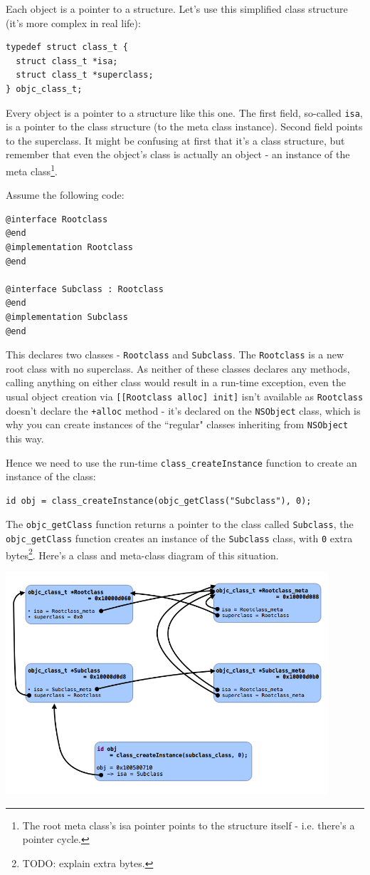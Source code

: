 Each object is a pointer to a structure. Let's use this simplified class structure (it's more complex in real life):

\begin{verbatim}
typedef struct class_t {
  struct class_t *isa;
  struct class_t *superclass;
} objc_class_t;
\end{verbatim}

Every object is a pointer to a structure like this one. The first field, so-called \verb=isa=, is a pointer to the class structure (to the meta class instance). Second field points to the superclass. It might be confusing at first that it's a class structure, but remember that even the object's class is actually an object - an instance of the meta class\footnote{The root meta class's isa pointer points to the structure itself - i.e. there's a pointer cycle.}.

Assume the following code:
\begin{verbatim}@interface Rootclass
@end
@implementation Rootclass
@end

@interface Subclass : Rootclass
@end
@implementation Subclass
@end 
\end{verbatim}

This declares two classes - \verb=Rootclass= and \verb=Subclass=. The \verb=Rootclass= is a new root class with no superclass. As neither of these classes declares any methods, calling anything on either class would result in a run-time exception, even the usual object creation via \verb=[[Rootclass alloc] init]= isn't available as \verb=Rootclass= doesn't declare the \verb=+alloc= method - it's declared on the \verb=NSObject= class, which is why you can create instances of the ``regular" classes inheriting from \verb=NSObject= this way.

Hence we need to use the run-time \verb=class_createInstance= function to create an instance of the class: 
\begin{verbatim}
id obj = class_createInstance(objc_getClass("Subclass"), 0);
\end{verbatim}

The \verb=objc_getClass= function returns a pointer to the class called \verb=Subclass=, the \verb=objc_getClass= function creates an instance of the \verb=Subclass= class, with \verb=0= extra bytes\footnote{TODO: explain extra bytes.}. Here's a class and meta-class diagram of this situation.

\includegraphics[width=120mm]{img/metaclass_graph.png}

